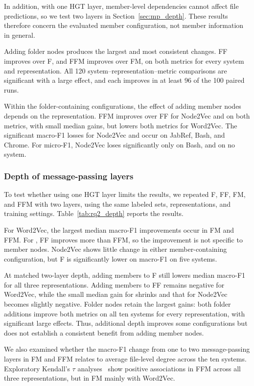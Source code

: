 In addition, with one HGT layer, member-level dependencies cannot affect file predictions, so we test two layers in Section~\ref{sec:mp_depth}. These results therefore concern the evaluated member configuration, not member information in general.

Adding folder nodes produces the largest and most consistent changes. FF improves over F, and FFM improves over FM, on both metrics for every system and representation. All 120 system--representation--metric comparisons are significant with a large effect, and each improves in at least 96 of the 100 paired runs.

Within the folder-containing configurations, the effect of adding member nodes depends on the representation. FFM improves over FF for Node2Vec and \ft{} on both metrics, with small median gains, but lowers both metrics for Word2Vec. The significant macro-F1 losses for Node2Vec and \ft{} occur on JabRef, Bash, and Chrome. For micro-F1, Node2Vec loses significantly only on Bash, and \ft{} on no system.

\subsubsection{Depth of message-passing layers \label{sec:mp_depth}}
To test whether using one HGT layer limits the results, we repeated F, FF, FM, and FFM with two layers, using the same labeled sets, representations, and training settings. Table~\ref{tab:rq2_depth} reports the results.



For Word2Vec, the largest median macro-F1 improvements occur in FM and FFM. For \ft{}, FF improves more than FFM, so the improvement is not specific to member nodes. Node2Vec shows little change in either member-containing configuration, but F is significantly lower on macro-F1 on five systems.

At matched two-layer depth, adding members to F still lowers median macro-F1 for all three representations. Adding members to FF remains negative for Word2Vec, while the small median gain for \ft{} shrinks and that for Node2Vec becomes slightly negative. Folder nodes retain the largest gains: both folder additions improve both metrics on all ten systems for every representation, with significant large effects. Thus, additional depth improves some configurations but does not establish a consistent benefit from adding member nodes.

We also examined whether the macro-F1 change from one to two message-passing layers in FM and FFM relates to average file-level degree across the ten systems. Exploratory Kendall's $\tau$ analyses~\cite{kendall} show positive associations in FFM across all three representations, but in FM mainly with Word2Vec.

